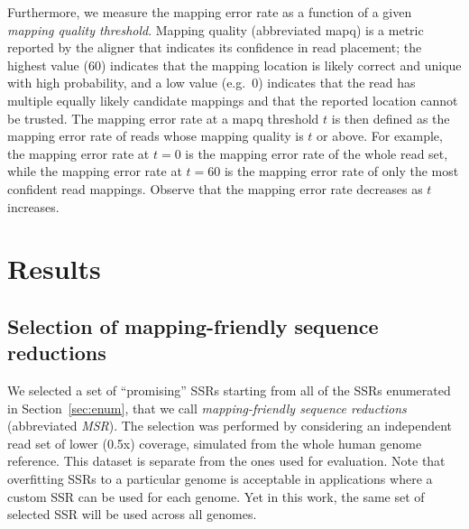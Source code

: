 \documentclass[
  11pt,
  twoside]{scrbook}
\begin{document}
Furthermore, we measure the mapping error rate as a function of a given \emph{mapping quality threshold}. Mapping quality (abbreviated mapq) is a metric reported by the aligner that indicates its confidence in read placement; the highest value (60) indicates that the mapping location is likely correct and unique with high probability, and a low value (e.g.~0) indicates that the read has multiple equally likely candidate mappings and that the reported location cannot be trusted. The mapping error rate at a mapq threshold \(t\) is then defined as the mapping error rate of reads whose mapping quality is \(t\) or above. For example, the mapping error rate at \(t=0\) is the mapping error rate of the whole read set, while the mapping error rate at \(t=60\) is the mapping error rate of only the most confident read mappings. Observe that the mapping error rate decreases as \(t\) increases.

\hypertarget{hpc-results}{%
\section{Results}\label{hpc-results}}

\hypertarget{selection-of-mapping-friendly-sequence-reductions}{%
\subsection{Selection of mapping-friendly sequence reductions}\label{selection-of-mapping-friendly-sequence-reductions}}

We selected a set of ``promising'' SSRs starting from all of the SSRs enumerated in Section~\ref{sec:enum}, that we call \emph{mapping-friendly sequence reductions} (abbreviated \emph{MSR}). The selection was performed by considering an independent read set of lower (0.5x) coverage, simulated from the whole human genome reference. This dataset is separate from the ones used for evaluation. Note that overfitting SSRs to a particular genome is acceptable in applications where a custom SSR can be used for each genome. Yet in this work, the same set of selected SSR will be used across all genomes.
\end{document}

